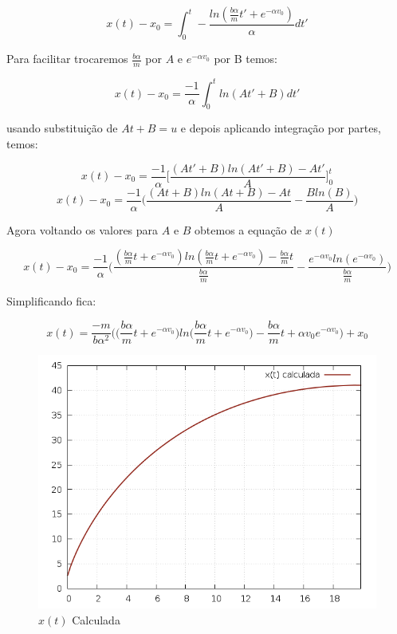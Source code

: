 \documentclass[a4paper,12pt]{article}
\begin{document}
		\[ x(t) - x_0 = \int_0^t -\frac{ln(\frac{b \alpha}{m}t'+e^{-\alpha v_0})}{\alpha} dt' \]
		
		Para facilitar trocaremos $\frac{b \alpha }{m}$ por $A$ e $e^{-\alpha v_0}$ por B temos:
		
		\[ x(t)-x_0 = \frac{-1}{\alpha}\int_0^t ln(At' + B) dt'\]
		
		usando substituição de $At+B = u$ e depois aplicando integração por partes, temos:
		
		
		\[ x(t)-x_0 = \frac{-1}{\alpha} \Bigg[\frac{(At'+B)ln(At'+B)-At'}{A} \Bigg]_{0}^{t}\]
		\[ x(t)-x_0 = \frac{-1}{\alpha} \Bigg( \frac{(At+B)ln(At+B)-At}{A} -\frac{Bln(B)}{A} \Bigg)\]
		
		Agora voltando os valores para $A$ e $B$ obtemos a equação de $x(t)$
		
		\[ x(t) - x_0 = \frac{-1}{\alpha} \Bigg( \frac{(\frac{b\alpha}{m}t+e^{-\alpha v_0})ln(\frac{b\alpha}{m}t+e^{-\alpha v_0})-\frac{b\alpha}{m}t}{\frac{b \alpha}{m}} -\frac{e^{-\alpha v_0}ln(e^{-\alpha v_0})}{\frac{b\alpha}{m}} \Bigg) \]
		
		Simplificando fica:
		
		
		\[ x(t) = \frac{-m}{b\alpha^2}  \Bigg( \Bigg(\frac{b\alpha}{m}t + e^{-\alpha v_0}\Bigg)  ln\Bigg(\frac{b\alpha}{m}t + e^{-\alpha v_0}\Bigg) - \frac{b\alpha}{m}t +\alpha v_0e^{-\alpha v_0}\Bigg) + x_0 \]
		
		\begin{figure}[h]
			\centering
			\includegraphics[scale=0.6]{3o2.png}
			\caption{$x(t)$ Calculada}
		\end{figure}	
	
\end{document}
